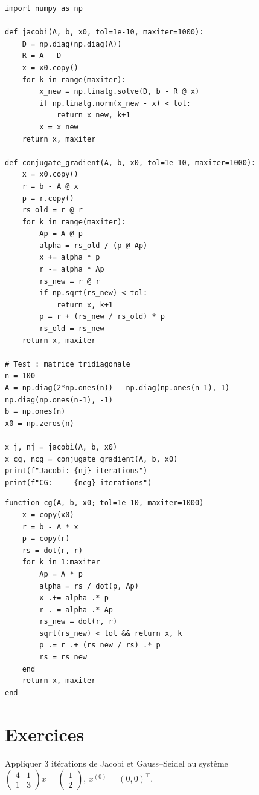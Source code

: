 \begin{codeblock}[title=\textbf{Python}]
\begin{verbatim}
import numpy as np

def jacobi(A, b, x0, tol=1e-10, maxiter=1000):
    D = np.diag(np.diag(A))
    R = A - D
    x = x0.copy()
    for k in range(maxiter):
        x_new = np.linalg.solve(D, b - R @ x)
        if np.linalg.norm(x_new - x) < tol:
            return x_new, k+1
        x = x_new
    return x, maxiter

def conjugate_gradient(A, b, x0, tol=1e-10, maxiter=1000):
    x = x0.copy()
    r = b - A @ x
    p = r.copy()
    rs_old = r @ r
    for k in range(maxiter):
        Ap = A @ p
        alpha = rs_old / (p @ Ap)
        x += alpha * p
        r -= alpha * Ap
        rs_new = r @ r
        if np.sqrt(rs_new) < tol:
            return x, k+1
        p = r + (rs_new / rs_old) * p
        rs_old = rs_new
    return x, maxiter

# Test : matrice tridiagonale
n = 100
A = np.diag(2*np.ones(n)) - np.diag(np.ones(n-1), 1) - np.diag(np.ones(n-1), -1)
b = np.ones(n)
x0 = np.zeros(n)

x_j, nj = jacobi(A, b, x0)
x_cg, ncg = conjugate_gradient(A, b, x0)
print(f"Jacobi: {nj} iterations")
print(f"CG:     {ncg} iterations")
\end{verbatim}
\end{codeblock}

\begin{codeblock}[title=\textbf{Julia}]
\begin{verbatim}
function cg(A, b, x0; tol=1e-10, maxiter=1000)
    x = copy(x0)
    r = b - A * x
    p = copy(r)
    rs = dot(r, r)
    for k in 1:maxiter
        Ap = A * p
        alpha = rs / dot(p, Ap)
        x .+= alpha .* p
        r .-= alpha .* Ap
        rs_new = dot(r, r)
        sqrt(rs_new) < tol && return x, k
        p .= r .+ (rs_new / rs) .* p
        rs = rs_new
    end
    return x, maxiter
end
\end{verbatim}
\end{codeblock}

\section{Exercices}

\begin{exercice}[$\star$]
Appliquer 3 it\'erations de Jacobi et Gauss--Seidel au syst\`eme $\begin{pmatrix}4&1\\1&3\end{pmatrix}x=\begin{pmatrix}1\\2\end{pmatrix}$, $x^{(0)}=(0,0)^\top$.
\end{exercice}

